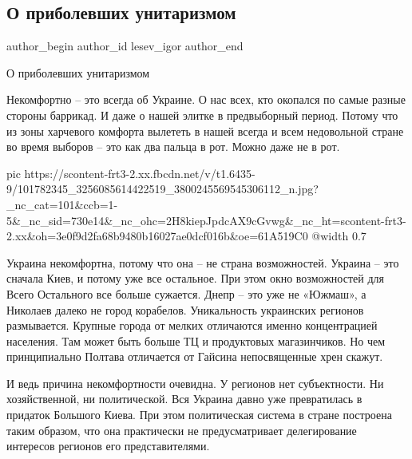  
 
 
 
 
 
\subsection{О приболевших унитаризмом}
\label{sec:04_06_2020.fb.lesev_igor.1.unitarizm_ukraina}
 
\ifcmt
 author_begin
   author_id lesev_igor
 author_end
\fi

О приболевших унитаризмом

Некомфортно – это всегда об Украине. О нас всех, кто окопался по самые разные
стороны баррикад. И даже о нашей элитке в предвыборный период. Потому что из
зоны харчевого комфорта вылететь в нашей всегда и всем недовольной стране во
время выборов – это как два пальца в рот. Можно даже не в рот.

\ifcmt
  pic https://scontent-frt3-2.xx.fbcdn.net/v/t1.6435-9/101782345_3256085614422519_3800245569545306112_n.jpg?_nc_cat=101&ccb=1-5&_nc_sid=730e14&_nc_ohc=2H8kiepJpdcAX9cGvwg&_nc_ht=scontent-frt3-2.xx&oh=3e0f9d2fa68b9480b16027ae0dcf016b&oe=61A519C0
  @width 0.7
\fi

Украина некомфортна, потому что она – не страна возможностей. Украина – это
сначала Киев, и потому уже все остальное. При этом окно возможностей для Всего
Остального все больше сужается. Днепр – это уже не «Южмаш», а Николаев далеко
не город корабелов. Уникальность украинских регионов размывается. Крупные
города от мелких отличаются именно концентрацией населения. Там может быть
больше ТЦ и продуктовых магазинчиков. Но чем принципиально Полтава отличается
от Гайсина непосвященные хрен скажут.

И ведь причина некомфортности очевидна. У регионов нет субъектности. Ни
хозяйственной, ни политической. Вся Украина давно уже превратилась в придаток
Большого Киева. При этом политическая система в стране построена таким образом,
что она практически не предусматривает делегирование интересов регионов его
представителями.

